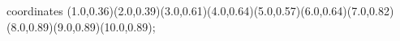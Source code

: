 					coordinates { (1.0,0.36)(2.0,0.39)(3.0,0.61)(4.0,0.64)(5.0,0.57)(6.0,0.64)(7.0,0.82)(8.0,0.89)(9.0,0.89)(10.0,0.89)};